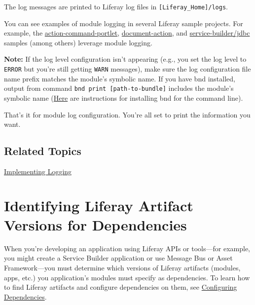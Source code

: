 The log messages are printed to Liferay log files in
\texttt{{[}Liferay\_Home{]}/logs}.

You can see examples of module logging in several Liferay sample
projects. For example, the
\href{https://github.com/liferay/liferay-blade-samples/tree/master/gradle/apps/action-command-portlet}{action-command-portlet},
\href{https://github.com/liferay/liferay-blade-samples/tree/master/gradle/extensions/document-action}{document-action},
and
\href{https://github.com/liferay/liferay-blade-samples/tree/master/gradle/apps/service-builder/jdbc}{service-builder/jdbc}
samples (among others) leverage module logging.

\noindent\hrulefill

\textbf{Note:} If the log level configuration isn't appearing (e.g., you
set the log level to \texttt{ERROR} but you're still getting
\texttt{WARN} messages), make sure the log configuration file name
prefix matches the module's symbolic name. If you have bnd installed,
output from command \texttt{bnd\ print\ {[}path-to-bundle{]}} includes
the module's symbolic name
(\href{https://github.com/bndtools/bnd/wiki/Install-bnd-on-the-command-line}{Here}
are instructions for installing bnd for the command line).

\noindent\hrulefill

That's it for module log configuration. You're all set to print the
information you want.

\section{Related Topics}\label{related-topics-27}

\href{/docs/7-2/appdev/-/knowledge_base/a/implementing-logging}{Implementing
Logging}

\chapter{Identifying Liferay Artifact Versions for
Dependencies}\label{identifying-liferay-artifact-versions-for-dependencies}

When you're developing an application using Liferay APIs or tools---for
example, you might create a Service Builder application or use Message
Bus or Asset Framework---you must determine which versions of Liferay
artifacts (modules, apps, etc.) you application's modules must specify
as dependencies. To learn how to find Liferay artifacts and configure
dependencies on them, see
\href{/docs/7-2/customization/-/knowledge_base/c/configuring-dependencies}{Configuring
Dependencies}.

